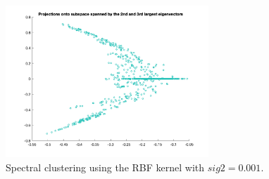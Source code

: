 \documentclass[10pt,a4paper]{article}
\begin{document}
\begin{figure}[h!]
\centering
  \includegraphics[width=3in]{rings0001.png}
  \caption{Spectral clustering using the RBF kernel with $sig2=0.001$.}
  \label{fig:rings0001}
\end{figure}



\end{document}
